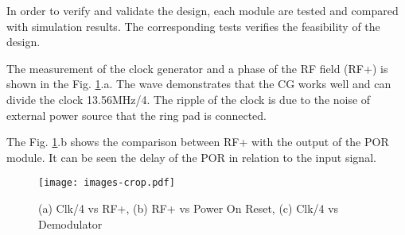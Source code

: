 In order to verify and validate the design, each module are tested and compared with simulation results. The corresponding tests verifies the feasibility of the design.

The measurement of the clock generator and a phase of the RF field (RF+) is shown in the Fig. \ref{fig:meas}.a. The wave demonstrates that the CG works well and can divide the clock 13.56MHz/4. The ripple of the clock is due to the noise of external power source that the ring pad is connected. 

The Fig. \ref{fig:meas}.b shows the comparison between RF+ with the output of the POR module. It can be seen the delay of the POR in relation to the input signal.

\begin{figure}[h]
  \centering
  \texttt{[image: images-crop.pdf]}
  \caption{(a) Clk/4 vs RF+, (b) RF+ vs Power On Reset, (c) Clk/4 vs Demodulator}
  \label{fig:meas}
\end{figure}